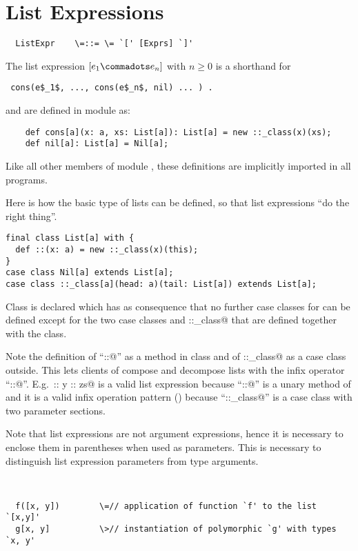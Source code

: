 \documentclass[11pt]{report}
\begin{document}
\section{List Expressions}
\label{sec:list-exprs}

\syntax\begin{verbatim}
  ListExpr	  \=::= \= `[' [Exprs] `]'
\end{verbatim}

The list expression $[ e_1 \commadots e_n ]$ with $n \geq 0$ is a
shorthand for
\begin{verbatim}
 cons(e$_1$, ..., cons(e$_n$, nil) ... ) .
\end{verbatim}
\verb@cons@ and \verb@nil@ are defined in module \verb@Predef@ as:
\begin{verbatim}
    def cons[a](x: a, xs: List[a]): List[a] = new ::_class(x)(xs);
    def nil[a]: List[a] = Nil[a];
\end{verbatim}
Like all other members of module \verb@Predef@, these definitions
are implicitly imported in all programs.

\example Here is how the basic type of lists can be defined, so that
list expressions ``do the right thing''.
\begin{verbatim}
final class List[a] with {
  def ::(x: a) = new ::_class(x)(this);
}
case class Nil[a] extends List[a];
case class ::_class[a](head: a)(tail: List[a]) extends List[a];
\end{verbatim}
Class \verb@List@ is declared \verb@final@ which has as
consequence that no further case classes for \verb@List@ can be
defined except for the two case classes \verb@Nil@ and \verb@::_class@ that are
defined together with the class.

Note the definition of ``\verb@::@'' as a method in class \verb@List@
and of \verb@::_class@ as a case class outside.  This lets clients of
\verb@List@ compose and decompose lists with the infix operator
``\verb@::@''. E.g.\ \verb@x :: y :: zs@ is a valid list expression
because ``\verb@::@'' is a unary method of \verb@List@ and it is a
valid infix operation pattern () because
``\verb@::_class@'' is a case class with two parameter sections.

Note that list expressions are not argument expressions, hence it is
necessary to enclose them in parentheses when used as parameters.
This is necessary to distinguish list expression parameters from type arguments.

\example\

\begin{verbatim}
  f([x, y])	       \=// application of function `f' to the list `[x,y]'
  g[x, y]	       \>// instantiation of polymorphic `g' with types `x, y'
\end{verbatim}
\end{document}
